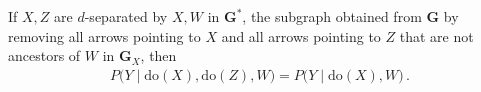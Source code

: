     \begin{axiom}
        If $X,Z$ are $d$-separated by $X,W$ in $\mathbf{G}^*$, the subgraph obtained from $\mathbf{G}$ by removing all arrows pointing to $X$ and all arrows pointing to $Z$ that are not ancestors of $W$ in $\mathbf{G}_X$, then
        \begin{gather}
            P\bigl(Y\mid\mathrm{do}(X),\mathrm{do}(Z),W\bigr) = P\bigl(Y\mid\mathrm{do}(X),W\bigr)\,.
        \end{gather}
    \end{axiom}

